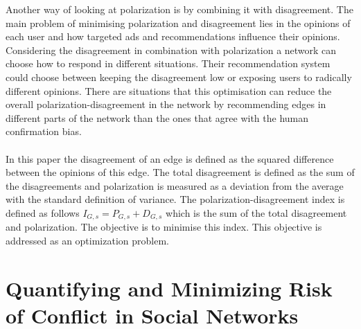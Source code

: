 Another way of looking at polarization is by combining it with disagreement. The main problem of minimising polarization and disagreement lies in the opinions of each user and how targeted ads and recommendations influence their opinions.
Considering the disagreement in combination with polarization a network can choose how to respond in different situations. Their recommendation system could choose between keeping the disagreement low or exposing users to radically different opinions. 
There are situations that this optimisation can reduce the overall polarization-disagreement in the network by recommending edges in different parts of the network than the ones that agree with the human confirmation bias. 
\\
\\
\noindent In this paper the disagreement of an edge is defined as the squared difference between the opinions of this edge. The total disagreement is defined as the sum of the disagreements and polarization is measured as a deviation from the average with the standard definition of variance. The polarization-disagreement index is defined as follows $I_{G,s} = P_{G,s} +D_{G,s}$ which is the sum of the total disagreement and polarization. The objective is to minimise this index. This objective is addressed as an optimization problem.
\cite{musco}

\clearpage

\section{Quantifying and Minimizing Risk of Conflict in Social Networks}
\label{sec:riskOfConflict}

